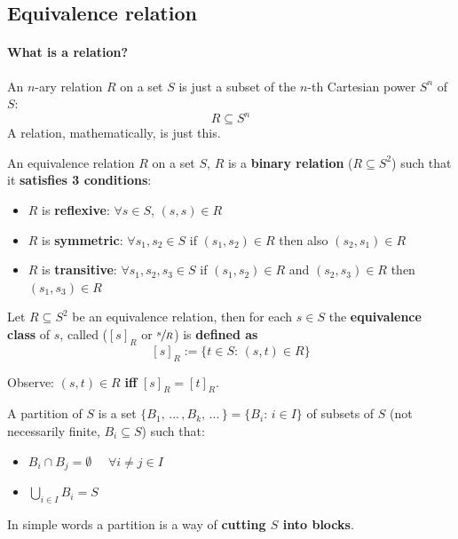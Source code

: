 	\subsection{Equivalence relation}

	\paragraph{What is a relation?} An $n$-ary relation $R$ on a set $S$ is just a subset of the $n$-th Cartesian power $S^n$ of $S$:
	$$ R \subseteq S^n$$
	A relation, mathematically, is just this.\\

	\begin{definition}
	  	An equivalence relation $R$ on a set $S$, $R$ is a \textbf{binary relation} ($R \subseteq S^2$) such that it \textbf{satisfies 3 conditions}:
	\begin{itemize}
		\item $R$ is \textbf{reflexive}: $\forall s \in S$, $(s,s) \in R$
		\item $R$ is \textbf{symmetric}: $\forall s_1, s_2 \in S$ if $(s_1, s_2) \in R$ then also $(s_2, s_1) \in R$
		\item $R$ is \textbf{transitive}: $\forall s_1, s_2, s_3 \in S$ if $(s_1, s_2) \in R$ and $(s_2, s_3) \in R$ then $(s_1, s_3) \in R$
	\end{itemize}
	\end{definition}

	\begin{definition} Let $R \subseteq S^2$ be an equivalence relation, then for each $s \in S$ the 		\textbf{equivalence class} of $s$, called ($[s]_R$ or $\sfrac{s}{R}$) is \textbf{defined as}
	$$ [s]_R := \{t \in S: \, (s,t) \in R\} $$

	\noindent
	Observe: $(s,t) \in R$ \textbf{ iff } $[s]_R = [t]_R$.
	\end{definition}

	\begin{definition} A partition of $S$ is a set $\{B_1, \, ... \, , B_k , \, ... \, \} = \{B_i : \, i \in  I\}$ of subsets of $S$ (not necessarily finite, $B_i \subseteq S$) such that:
	\begin{itemize}
		\item $B_i \cap B_j = \emptyset$  $\quad \forall i \neq j \in I$
		\item $\bigcup_{i \in I} B_i = S$
	\end{itemize}

	\noindent
	In simple words a partition is a way of \textbf{cutting $S$ into blocks}.
	\end{definition}

